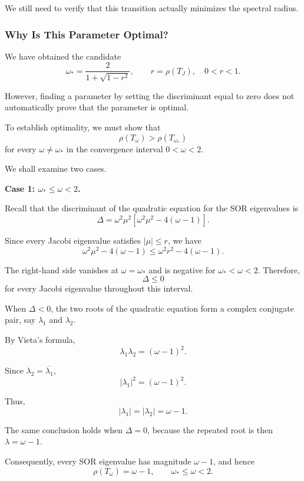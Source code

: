\documentclass[11pt,a4paper]{article}
\theoremstyle{definition}
\theoremstyle{remark}
\begin{document}
We still need to verify that this
transition actually minimizes the
spectral radius.




\subsubsection*{Why Is This Parameter Optimal?}

We have obtained the candidate
\[
    \omega_*=
    \frac{2}{1+\sqrt{1-r^2}},
    \qquad r=\rho(T_J), \quad 0<r<1.
\]

However, finding a parameter by setting the
discriminant equal to zero does not automatically
prove that the parameter is optimal.

To establish optimality, we must show that
\[
    \rho(T_\omega)>\rho(T_{\omega_*})
\]
for every $\omega\neq\omega_*$ in the
convergence interval $0<\omega<2$.

We shall examine two cases.

\medskip
\noindent
\textbf{Case 1: $\omega_*\leq\omega<2$.}

Recall that the discriminant of the quadratic
equation for the SOR eigenvalues is
\[
    \Delta=
    \omega^2\mu^2
    \left[\omega^2\mu^2-4(\omega-1)\right].
\]

Since every Jacobi eigenvalue satisfies
$|\mu|\leq r$, we have
\[
    \omega^2\mu^2-4(\omega-1)
    \leq
    \omega^2r^2-4(\omega-1).
\]

The right-hand side vanishes at
$\omega=\omega_*$ and is negative for
$\omega_*<\omega<2$. Therefore,
\[
    \boxed{\Delta\leq0}
\]
for every Jacobi eigenvalue throughout
this interval.

When $\Delta<0$, the two roots of the
quadratic equation form a complex conjugate
pair, say $\lambda_1$ and $\lambda_2$.

By Vieta's formula,
\[
    \lambda_1\lambda_2=(\omega-1)^2.
\]

Since $\lambda_2=\overline{\lambda_1}$,
\[
    |\lambda_1|^2=(\omega-1)^2.
\]

Thus,
\[
    |\lambda_1|=|\lambda_2|=\omega-1.
\]

The same conclusion holds when $\Delta=0$,
because the repeated root is then
$\lambda=\omega-1$.

Consequently, every SOR eigenvalue has
magnitude $\omega-1$, and hence
\begin{equation}
    \boxed{
    \rho(T_\omega)=\omega-1,
    \qquad \omega_*\leq\omega<2.
    }
    \label{eq:sor_rho_right}
\end{equation}
\end{document}
